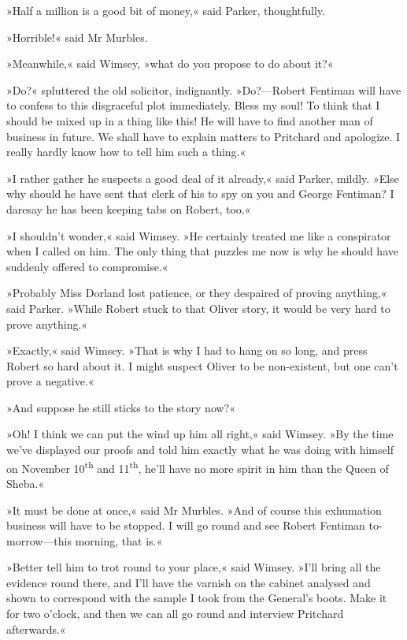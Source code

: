 »Half a million is a good bit of money,« said Parker, thoughtfully.

»Horrible!« said Mr Murbles.

»Meanwhile,« said Wimsey, »what do you propose to do about it?«

»Do?« spluttered the old solicitor, indignantly. »Do?—Robert Fentiman will have to confess to this disgraceful plot immediately. Bless my soul! To think that I should be mixed up in a thing like this! He will have to find another man of business in future. We shall have to explain matters to Pritchard and apologize. I really hardly know how to tell him such a thing.«

»I rather gather he suspects a good deal of it already,« said Parker, mildly. »Else why should he have sent that clerk of his to spy on you and George Fentiman? I daresay he has been keeping tabs on Robert, too.«

»I shouldn't wonder,« said Wimsey. »He certainly treated me like a conspirator when I called on him. The only thing that puzzles me now is why he should have suddenly offered to compromise.«

»Probably Miss Dorland lost patience, or they despaired of proving anything,« said Parker. »While Robert stuck to that Oliver story, it would be very hard to prove anything.«

»Exactly,« said Wimsey. »That is why I had to hang on so long, and press Robert so hard about it. I might suspect Oliver to be non-existent, but one can't prove a negative.«

»And suppose he still sticks to the story now?«

»Oh! I think we can put the wind up him all right,« said Wimsey. »By the time we've displayed our proofs and told him exactly what he was doing with himself on November  10\textsuperscript{th} and  11\textsuperscript{th}, he'll have no more spirit in him than the Queen of Sheba.«

»It must be done at once,« said Mr Murbles. »And of course this exhumation business will have to be stopped. I will go round and see Robert Fentiman to-morrow—this morning, that is.«

»Better tell him to trot round to your place,« said Wimsey. »I'll bring all the evidence round there, and I'll have the varnish on the cabinet analysed and shown to correspond with the sample I took from the General's boots. Make it for two o'clock, and then we can all go round and interview Pritchard afterwards.«

